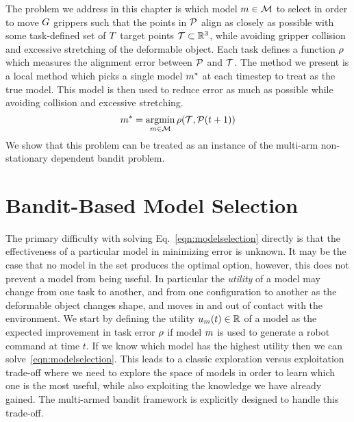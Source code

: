 The problem we address in this chapter is which model $m \in \mathcal{M}$ to select in order to move $G$ grippers such that the points in $\mathcal{P}$ align as closely as possible with some task-defined set of $T$ target points $\mathcal{T} \subset \mathbb{R}^3$, while avoiding gripper collision and excessive stretching of the deformable object. Each task defines a function $\rho$ which measures the alignment error between $\mathcal{P}$ and $\mathcal{T}$. The method we present is a local method which picks a single model $m^*$ at each timestep to treat as the true model. This model is then used to reduce error as much as possible while avoiding collision and excessive stretching. 
\begin{equation}
    m^* = \operatorname*{argmin}_{m \in \mathcal{M}} \rho(\mathcal{T}, \mathcal{P}(t+1))
    \label{eqn:modelselection}
\end{equation}
We show that this problem can be treated as an instance of the multi-arm non-stationary dependent bandit problem.


\section{Bandit-Based Model Selection}

The primary difficulty with solving Eq.~\eqref{eqn:modelselection} directly is that the effectiveness of a particular model in minimizing error is unknown. It may be the case that no model in the set produces the optimal option, however, this does not prevent a model from being useful. In particular the \textit{utility} of a model may change from one task to another, and from one configuration to another as the deformable object changes shape, and moves in and out of contact with the environment. We start by defining the utility $u_m(t) \in \mathbb{R}$ of a model as the expected improvement in task error $\rho$ if model $m$ is used to generate a robot command at time $t$. If we know which model has the highest utility then we can solve~\eqref{eqn:modelselection}. This leads to a classic exploration versus exploitation trade-off where we need to explore the space of models in order to learn which one is the most useful, while also exploiting the knowledge we have already gained.  The multi-armed bandit framework is explicitly designed to handle this trade-off.

